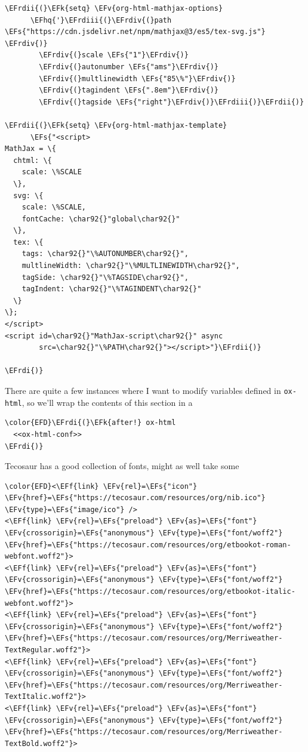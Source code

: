 \documentclass{scrartcl}
\newcommand{\EFk}[1]{\textcolor{EFk}{#1}} %
\newcommand{\EFs}[1]{\textcolor{EFs}{#1}} %
\newcommand{\EFv}[1]{\textcolor{EFv}{#1}} %
\newcommand{\EFf}[1]{\textcolor{EFf}{#1}} %
\newcommand{\EFhq}[1]{\textcolor{EFhq}{#1}} %
\newcommand{\EFrdi}[1]{\textcolor{EFrdi}{#1}} %
\newcommand{\EFrdii}[1]{\textcolor{EFrdii}{#1}} %
\newcommand{\EFrdiii}[1]{\textcolor{EFrdiii}{#1}} %
\newcommand{\EFrdiv}[1]{\textcolor{EFrdiv}{#1}} %
\begin{document}
\begin{Code}
\begin{Verbatim}[]
                \EFrdii{(}\EFk{setq} \EFv{org-html-mathjax-options}
      \EFhq{'}\EFrdiii{(}\EFrdiv{(}path \EFs{"https://cdn.jsdelivr.net/npm/mathjax@3/es5/tex-svg.js"} \EFrdiv{)}
        \EFrdiv{(}scale \EFs{"1"}\EFrdiv{)}
        \EFrdiv{(}autonumber \EFs{"ams"}\EFrdiv{)}
        \EFrdiv{(}multlinewidth \EFs{"85\%"}\EFrdiv{)}
        \EFrdiv{(}tagindent \EFs{".8em"}\EFrdiv{)}
        \EFrdiv{(}tagside \EFs{"right"}\EFrdiv{)}\EFrdiii{)}\EFrdii{)}

\EFrdii{(}\EFk{setq} \EFv{org-html-mathjax-template}
      \EFs{"<script>
MathJax = \{
  chtml: \{
    scale: \%SCALE
  \},
  svg: \{
    scale: \%SCALE,
    fontCache: \char92{}"global\char92{}"
  \},
  tex: \{
    tags: \char92{}"\%AUTONUMBER\char92{}",
    multlineWidth: \char92{}"\%MULTLINEWIDTH\char92{}",
    tagSide: \char92{}"\%TAGSIDE\char92{}",
    tagIndent: \char92{}"\%TAGINDENT\char92{}"
  \}
\};
</script>
<script id=\char92{}"MathJax-script\char92{}" async
        src=\char92{}"\%PATH\char92{}"></script>"}\EFrdii{)}

\EFrdi{)}
\end{Verbatim}
\end{Code}

There are quite a few instances where I want to modify variables defined in
\texttt{ox-html}, so we'll wrap the contents of this section in a
\begin{Code}
\begin{Verbatim}[]
\color{EFD}\EFrdi{(}\EFk{after!} ox-html
  <<ox-html-conf>>
\EFrdi{)}
\end{Verbatim}
\end{Code}

Tecosaur has a good collection of fonts, might as well take some
\begin{Code}
\begin{Verbatim}[]
\color{EFD}<\EFf{link} \EFv{rel}=\EFs{"icon"} \EFv{href}=\EFs{"https://tecosaur.com/resources/org/nib.ico"} \EFv{type}=\EFs{"image/ico"} />
<\EFf{link} \EFv{rel}=\EFs{"preload"} \EFv{as}=\EFs{"font"} \EFv{crossorigin}=\EFs{"anonymous"} \EFv{type}=\EFs{"font/woff2"} \EFv{href}=\EFs{"https://tecosaur.com/resources/org/etbookot-roman-webfont.woff2"}>
<\EFf{link} \EFv{rel}=\EFs{"preload"} \EFv{as}=\EFs{"font"} \EFv{crossorigin}=\EFs{"anonymous"} \EFv{type}=\EFs{"font/woff2"} \EFv{href}=\EFs{"https://tecosaur.com/resources/org/etbookot-italic-webfont.woff2"}>
<\EFf{link} \EFv{rel}=\EFs{"preload"} \EFv{as}=\EFs{"font"} \EFv{crossorigin}=\EFs{"anonymous"} \EFv{type}=\EFs{"font/woff2"} \EFv{href}=\EFs{"https://tecosaur.com/resources/org/Merriweather-TextRegular.woff2"}>
<\EFf{link} \EFv{rel}=\EFs{"preload"} \EFv{as}=\EFs{"font"} \EFv{crossorigin}=\EFs{"anonymous"} \EFv{type}=\EFs{"font/woff2"} \EFv{href}=\EFs{"https://tecosaur.com/resources/org/Merriweather-TextItalic.woff2"}>
<\EFf{link} \EFv{rel}=\EFs{"preload"} \EFv{as}=\EFs{"font"} \EFv{crossorigin}=\EFs{"anonymous"} \EFv{type}=\EFs{"font/woff2"} \EFv{href}=\EFs{"https://tecosaur.com/resources/org/Merriweather-TextBold.woff2"}>
\end{Verbatim}
\end{Code}
\end{document}
